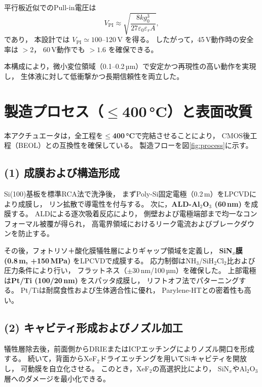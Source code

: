 \documentclass[conference]{IEEEtran}
\begin{document}
平行板近似でのPull-in電圧は
\begin{equation}
  V_{\mathrm{PI}} \approx
  \sqrt{\frac{8 k g_0^3}{27 \varepsilon_0 \varepsilon_r A}},
  \label{eq:pullin}
\end{equation}
であり，
本設計では $V_{\mathrm{PI}} \simeq 100$--120\,V を得る。
したがって，45\,V動作時の安全率は $>2$，
60\,V動作でも $>1.6$ を確保できる。

本構成により，微小変位領域（0.1--0.2\,µm）で安定かつ再現性の高い動作を実現し，
生体液に対して低衝撃かつ長期信頼性を両立した。

\section{製造プロセス（\texorpdfstring{$\le$}{<=}400\,\si{\celsius}）と表面改質}
本アクチュエータは，全工程を\textbf{$\le$400\,\si{\celsius}}で完結させることにより，
CMOS後工程（BEOL）との互換性を確保している。
製造フローを図\ref{fig:process}に示す。

\subsection*{(1) 成膜および構造形成}
Si(100)基板を標準RCA法で洗浄後，
まずPoly-Si固定電極（0.2\,\textmu m）をLPCVDにより成膜し，
リン拡散で導電性を付与する。
次に，\textbf{ALD-Al$_2$O$_3$ (60\,nm)} を成膜する。
ALDによる逐次吸着反応により，
側壁および電極端部まで均一なコンフォーマル被覆が得られ，
高電界領域におけるリーク電流およびブレークダウンを防止する。

その後，フォトリソ＋酸化膜犠牲層によりギャップ領域を定義し，
\textbf{SiN$_x$膜 (0.8\,\textmu m, +150\,MPa)} をLPCVDで成膜する。
応力制御はNH$_3$/SiH$_2$Cl$_2$比および圧力条件により行い，
フラットネス（$\pm$30\,nm/100\,µm）を確保した。
上部電極は\textbf{Pt/Ti (100/20\,nm)} をスパッタ成膜し，
リフトオフ法でパターニングする。
Pt/Tiは耐腐食性および生体適合性に優れ，
Parylene-HTとの密着性も高い。

\subsection*{(2) キャビティ形成およびノズル加工}
犠牲層除去後，前面側からDRIEまたはICPエッチングによりノズル開口を形成する。
続いて，背面からXeF$_2$ドライエッチングを用いてSiキャビティを開放し，
可動膜を自立化させる。
このとき，XeF$_2$の高選択比により，
SiN$_x$やAl$_2$O$_3$層へのダメージを最小化できる。
\end{document}
